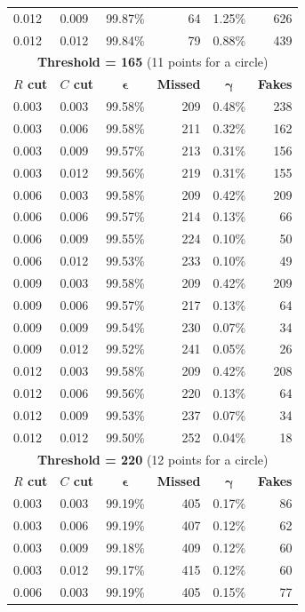 \documentclass[11pt,twoside]{scrreprt}
\begin{document}
\begin{longtable}{llcrcr}
0.012 & 0.009 & 99.87\% & 64 & 1.25\% & 626 \\
0.012 & 0.012 & 99.84\% & 79 & 0.88\% & 439 \\
\bottomrule
\toprule
\multicolumn{6}{c}{\textbf{Threshold = 165} (11 points for a circle)}\\
\midrule
\textbf{$R$ cut} & \textbf{$C$ cut} & $\boldsymbol{\epsilon}$ & \textbf{Missed} & $\boldsymbol{\gamma}$ & \textbf{Fakes} \\
\midrule
0.003 & 0.003 & 99.58\% & 209 & 0.48\% & 238 \\
0.003 & 0.006 & 99.58\% & 211 & 0.32\% & 162 \\
0.003 & 0.009 & 99.57\% & 213 & 0.31\% & 156 \\
0.003 & 0.012 & 99.56\% & 219 & 0.31\% & 155 \\
0.006 & 0.003 & 99.58\% & 209 & 0.42\% & 209 \\
0.006 & 0.006 & 99.57\% & 214 & 0.13\% & 66 \\
0.006 & 0.009 & 99.55\% & 224 & 0.10\% & 50 \\
0.006 & 0.012 & 99.53\% & 233 & 0.10\% & 49 \\
0.009 & 0.003 & 99.58\% & 209 & 0.42\% & 209 \\
0.009 & 0.006 & 99.57\% & 217 & 0.13\% & 64 \\
0.009 & 0.009 & 99.54\% & 230 & 0.07\% & 34 \\
0.009 & 0.012 & 99.52\% & 241 & 0.05\% & 26 \\
0.012 & 0.003 & 99.58\% & 209 & 0.42\% & 208 \\
0.012 & 0.006 & 99.56\% & 220 & 0.13\% & 64 \\
0.012 & 0.009 & 99.53\% & 237 & 0.07\% & 34 \\
0.012 & 0.012 & 99.50\% & 252 & 0.04\% & 18 \\
\bottomrule
\toprule
\multicolumn{6}{c}{\textbf{Threshold = 220} (12 points for a circle)}\\
\midrule
\textbf{$R$ cut} & \textbf{$C$ cut} & $\boldsymbol{\epsilon}$ & \textbf{Missed} & $\boldsymbol{\gamma}$ & \textbf{Fakes} \\
\midrule
0.003 & 0.003 & 99.19\% & 405 & 0.17\% & 86 \\
0.003 & 0.006 & 99.19\% & 407 & 0.12\% & 62 \\
0.003 & 0.009 & 99.18\% & 409 & 0.12\% & 60 \\
0.003 & 0.012 & 99.17\% & 415 & 0.12\% & 60 \\
0.006 & 0.003 & 99.19\% & 405 & 0.15\% & 77 \\

\end{longtable}
\end{document}
